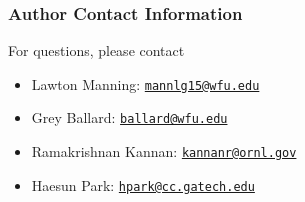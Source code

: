 \documentclass{beamer}
\newcommand{\email}[1]{\href{mailto:#1}{\texttt{#1}}}
\begin{document}
\begin{frame}
    \frametitle{Author Contact Information}
    
    For questions, please contact
    \begin{itemize}
        \item Lawton Manning: \email{mannlg15@wfu.edu}
        \item Grey Ballard: \email{ballard@wfu.edu}
        \item Ramakrishnan Kannan: \email{kannanr@ornl.gov}
        \item Haesun Park: \email{hpark@cc.gatech.edu}
    \end{itemize}
    
\end{frame}
    
\end{document}

